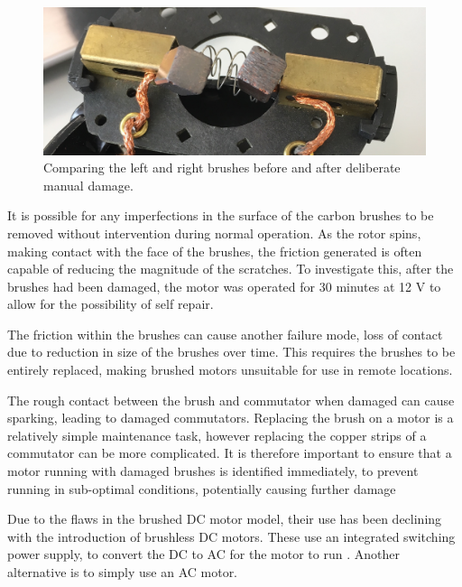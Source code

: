 \begin{figure}[t]
    \includegraphics[width=1.0\textwidth]{fig/brush_comparison.jpg}
    \caption[Brush Damage]{Comparing the left and right brushes before and after deliberate manual damage.}
    \label{fig:brush_damage}
\end{figure}

It is possible for any imperfections in the surface of the carbon brushes to be removed without intervention during normal operation. As the rotor spins, making contact with the face of the brushes, the friction generated is often capable of reducing the magnitude of the scratches. To investigate this, after the brushes had been damaged, the motor was operated for 30 minutes at 12 V to allow for the possibility of self repair. %

The friction within the brushes can cause another failure mode, loss of contact due to reduction in size of the brushes over time. This requires the brushes to be entirely replaced, making brushed motors unsuitable for use in remote locations.

The rough contact between the brush and commutator when damaged can cause sparking, leading to damaged commutators. Replacing the brush on a motor is a relatively simple maintenance task, however replacing the copper strips of a commutator can be more complicated. It is therefore important to ensure that a motor running with damaged brushes is identified immediately, to prevent running in sub-optimal conditions, potentially causing further damage

Due to the flaws in the brushed DC motor model, their use has been declining with the introduction of brushless DC motors. These use an integrated switching power supply, to convert the DC to AC for the motor to run \cite{hanselman2003brushless}. Another alternative is to simply use an AC motor. 

